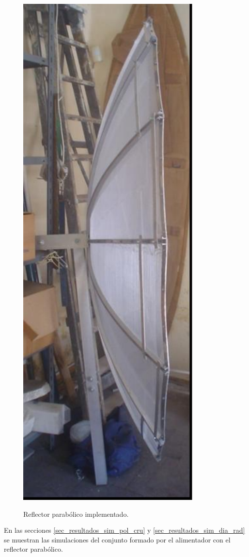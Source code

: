 \begin{figure} [H]
{\includegraphics[scale = 0.4]{Figures/Resultados/resultados_2}}
\caption{Reflector parabólico implementado.}
\label{grup_fig_resultados:1}
\end{figure}
En las secciones \ref{sec_resultados_sim_pol_cru} y \ref{sec_resultados_sim_dia_rad} se muestran las simulaciones del conjunto formado por el alimentador con el reflector parabólico.


